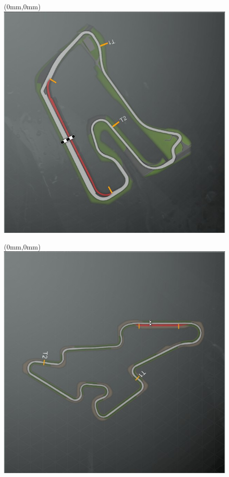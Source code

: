 \null\newpage
\begin{textblock*}{30mm}(0mm,0mm)%
\includegraphics[width=120mm]{TR/2015-05-20_00029.png}
\end{textblock*}
\null\newpage
\begin{textblock*}{30mm}(0mm,0mm)%
\includegraphics[width=120mm]{TR/2015-05-20_00009.png}
\end{textblock*}
